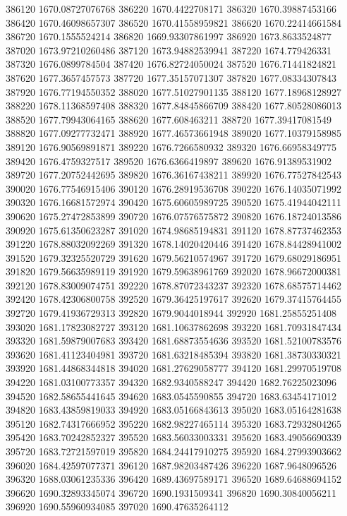 {386120 1670.08727076768
386220 1670.4422708171
386320 1670.39887453166
386420 1670.46098657307
386520 1670.41558959821
386620 1670.22414661584
386720 1670.1555524214
386820 1669.93307861997
386920 1673.8633524877
387020 1673.97210260486
387120 1673.94882539941
387220 1674.779426331
387320 1676.0899784504
387420 1676.82724050024
387520 1676.71441824821
387620 1677.3657457573
387720 1677.35157071307
387820 1677.08334307843
387920 1676.77194550352
388020 1677.51027901135
388120 1677.18968128927
388220 1678.11368597408
388320 1677.84845866709
388420 1677.80528086013
388520 1677.79943064165
388620 1677.608463211
388720 1677.39417081549
388820 1677.09277732471
388920 1677.46573661948
389020 1677.10379158985
389120 1676.90569891871
389220 1676.7266580932
389320 1676.66958349775
389420 1676.4759327517
389520 1676.6366419897
389620 1676.91389531902
389720 1677.20752442695
389820 1676.36167438211
389920 1676.77527842543
390020 1676.77546915406
390120 1676.28919536708
390220 1676.14035071992
390320 1676.16681572974
390420 1675.60605989725
390520 1675.41944042111
390620 1675.27472853899
390720 1676.07576575872
390820 1676.18724013586
390920 1675.61350623287
391020 1674.98685194831
391120 1678.87737462353
391220 1678.88032092269
391320 1678.14020420446
391420 1678.84428941002
391520 1679.32325520729
391620 1679.56210574967
391720 1679.68029186951
391820 1679.56635989119
391920 1679.59638961769
392020 1678.96672000381
392120 1678.83009074751
392220 1678.87072343237
392320 1678.68575714462
392420 1678.42306800758
392520 1679.36425197617
392620 1679.37415764455
392720 1679.41936729313
392820 1679.9044018944
392920 1681.25855251408
393020 1681.17823082727
393120 1681.10637862698
393220 1681.70931847434
393320 1681.59879007683
393420 1681.68873554636
393520 1681.52100783576
393620 1681.41123404981
393720 1681.63218485394
393820 1681.38730330321
393920 1681.44868344818
394020 1681.27629058777
394120 1681.29970519708
394220 1681.03100773357
394320 1682.9340588247
394420 1682.76225023096
394520 1682.58655441645
394620 1683.0545590855
394720 1683.63454171012
394820 1683.43859819033
394920 1683.05166843613
395020 1683.05164281638
395120 1682.74317666952
395220 1682.98227465114
395320 1683.72932804265
395420 1683.70242852327
395520 1683.56033003331
395620 1683.49056690339
395720 1683.72721597019
395820 1684.24417910275
395920 1684.27993903662
396020 1684.42597077371
396120 1687.98203487426
396220 1687.9648096526
396320 1688.03061235336
396420 1689.43697589171
396520 1689.64688694152
396620 1690.32893345074
396720 1690.1931509341
396820 1690.30840056211
396920 1690.55960934085
397020 1690.47635264112
}
